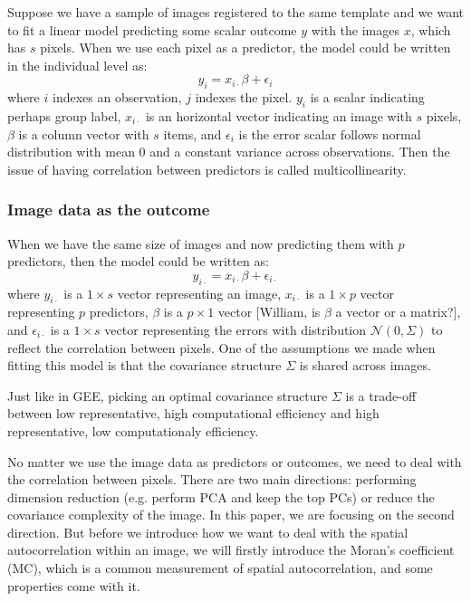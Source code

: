 \documentclass[12pt]{article}
\begin{document}
Suppose we have a sample of images registered to the same template and we want to fit a linear model predicting some scalar outcome \( y \) with the images \( x \), which has \( s \) pixels. When we use each pixel as a predictor, the model could be written in the individual level as:
\[
  y_i = x_{i \cdot} \beta + \epsilon_i
\]
where \( i \) indexes an observation, \( j \) indexes the pixel. \( y_i \) is a scalar indicating perhaps group label, \( x_{i \cdot} \) is an horizontal vector indicating an image with \( s \) pixels, \( \beta \) is a column vector with \( s \) items, and \( \epsilon_i \) is the error scalar follows normal distribution with mean 0 and a constant variance across observations. Then the issue of having correlation between predictors is called multicollinearity.

\subsubsection*{Image data as the outcome}

When we have the same size of images and now predicting them with \( p \) predictors, then the model could be written as:
\[
  y_{i \cdot} = x_{i \cdot} \beta + \epsilon_{i \cdot}
\]
where \( y_{i \cdot} \) is a \( 1 \times s \) vector representing an image, \( x_{i \cdot} \) is a \( 1 \times p \) vector representing \( p \) predictors, \( \beta \) is a \( p \times 1 \) vector [William, is \( \beta \) a vector or a matrix?], and \( \epsilon_{i \cdot} \) is a \( 1 \times s \) vector representing the errors with distribution \( \mathcal{N} (0, \Sigma) \) to reflect the correlation between pixels. One of the assumptions we made when fitting this model is that the covariance structure \( \Sigma \) is shared across images.

Just like in GEE, picking an optimal covariance structure \( \Sigma \) is a trade-off between low representative, high computational efficiency and high representative, low computationaly efficiency.

No matter we use the image data as predictors or outcomes, we need to deal with the correlation between pixels. There are two main directions: performing dimension reduction (e.g. perform PCA and keep the top PCs) or reduce the covariance complexity of the image. In this paper, we are focusing on the second direction. But before we introduce how we want to deal with the spatial autocorrelation within an image, we will firstly introduce the Moran's coefficient (MC), which is a common measurement of spatial autocorrelation, and some properties come with it.
\end{document}
